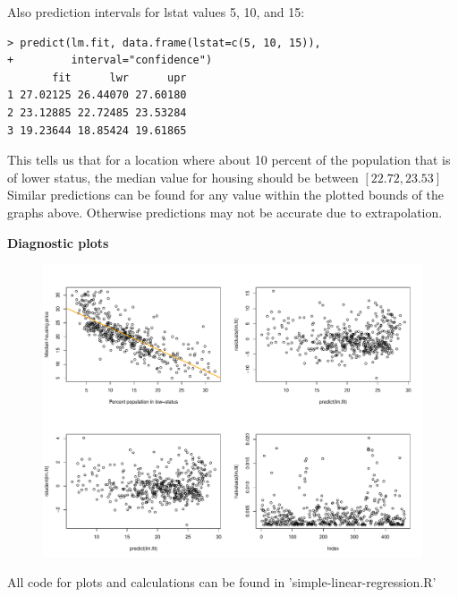 \documentclass{article}
\begin{document}
Also prediction intervals for lstat values 5, 10, and 15:

\begin{verbatim}
> predict(lm.fit, data.frame(lstat=c(5, 10, 15)),
+         interval="confidence")
       fit      lwr      upr
1 27.02125 26.44070 27.60180
2 23.12885 22.72485 23.53284
3 19.23644 18.85424 19.61865
\end{verbatim}

This tells us that for a location where about 10 percent of the population that
is of lower status, the median value for housing should be between $[22.72, 23.53]$
Similar predictions can be found for any value within the plotted bounds of the graphs
above. Otherwise predictions may not be accurate due to extrapolation.


\pagebreak

{\large \bf Diagnostic plots}
\begin{figure}[!ht]
  \centering
  \includegraphics[width=1.00\linewidth]{diagnostic-plots.pdf}
\end{figure}

All code for plots and calculations can be found in 'simple-linear-regression.R'
\end{document}
